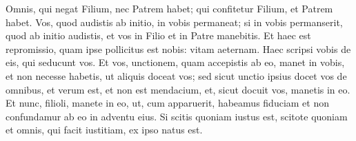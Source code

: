 \begin{biblechapter}
\verse Omnis, qui negat Filium, nec Patrem habet; qui confitetur Filium, et Patrem habet. 
\verse Vos, quod audistis ab initio, in vobis permaneat; si in vobis permanserit, quod ab initio audistis, et vos in Filio et in Patre manebitis. 
\verse Et haec est repromissio, quam ipse pollicitus est nobis: vitam aeternam. 
\verse Haec scripsi vobis de eis, qui seducunt vos. 
\verse Et vos, unctionem, quam accepistis ab eo, manet in vobis, et non necesse habetis, ut aliquis doceat vos; sed sicut unctio ipsius docet vos de omnibus, et verum est, et non est mendacium, et, sicut docuit vos, manetis in eo. 
\verse Et nunc, filioli, manete in eo, ut, cum apparuerit, habeamus fiduciam et non confundamur ab eo in adventu eius. 
\verse Si scitis quoniam iustus est, scitote quoniam et omnis, qui facit iustitiam, ex ipso natus est. 
\end{biblechapter}

